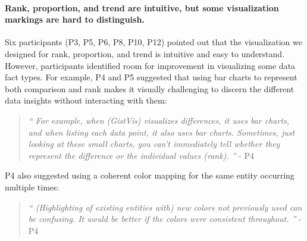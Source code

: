 \paragraph{Rank, proportion, and trend are intuitive, but some visualization markings are hard to distinguish.}
Six participants (P3, P5, P6, P8, P10, P12) pointed out that the visualization we designed for rank, proportion, and trend is intuitive and easy to understand. However, participants identified room for improvement in visualizing some data fact types. For example, P4 and P5 suggested that using bar charts to represent both comparison and rank makes it visually challenging to discern the different data insights without interacting with them: 
\begin{quote}
\textit{``
For example, when (GistVis) visualizes differences, it uses bar charts, and when listing each data point, it also uses bar charts. Sometimes, just looking at these small charts, you can't immediately tell whether they represent the difference or the individual values (rank).
    ''} - P4
\end{quote}
P4 also suggested using a coherent color mapping for the same entity occurring multiple times:
\begin{quote}
\textit{``
(Highlighting of existing entities with) new colors not previously used can be confusing. It would be better if the colors were consistent throughout.
    ''} - P4
\end{quote}
